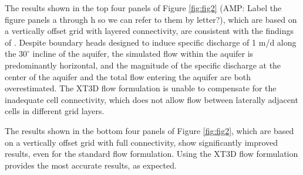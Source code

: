 \documentclass{article}
\begin{document}
The results shown in the top four panels of Figure \ref{fig:fig2} {\color{red} (AMP: Label the figure panels a through h so we can refer to them by letter?)}, which are based on a vertically offset grid with layered connectivity, are consistent with the findings of \cite{bardot2022}. Despite boundary heads designed to induce specific discharge of 1 m/d along the $30^{\circ}$ incline of the aquifer, the simulated flow within the aquifer is predominantly horizontal, and the magnitude of the specific discharge at the center of the aquifer and the total flow entering the aquifer are both overestimated. The XT3D flow formulation is unable to compensate for the inadequate cell connectivity, which does not allow flow between laterally adjacent cells in different grid layers.

The results shown in the bottom four panels of Figure \ref{fig:fig2}, which are based on a vertically offset grid with full connectivity, show significantly improved results, even for the standard flow formulation. Using the XT3D flow formulation provides the most accurate results, as expected.


\end{document}
